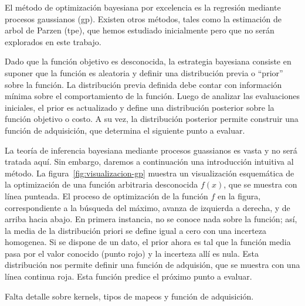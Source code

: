 El método de optimización bayesiana por excelencia es la regresión 
mediante procesos gaussianos (\acs{gp}). Existen otros métodos, tales 
como la estimación de arbol de Parzen (\acs{tpe}), que hemos estudiado 
inicialmente pero que no serán explorados en este trabajo. 

Dado que la función objetivo es desconocida, la estrategia bayesiana 
consiste en suponer que la función es aleatoria y definir una 
distribución previa o ``prior'' sobre la función. La distribución previa 
definida debe contar con información mínima sobre el comportamiento de la 
función. Luego de analizar las evaluaciones iniciales, el prior es 
actualizado y define una distribución posterior sobre la función objetivo 
o costo. A su vez, la distribución posterior permite construir una 
función de adquisición, que determina el siguiente punto a evaluar. 

La teoría de inferencia bayesiana mediante procesos guassianos es vasta
y no será tratada aquí. Sin embargo, daremos a continuación una 
introducción intuitiva al método. La figura~\ref{fig:visualizacion-gp} 
muestra un visualización esquemática de la optimización de una función
arbitraria desconocida $f(x)$, que se muestra con línea punteada. El 
proceso de optimización de la función $f$ en la figura, correspondiente 
a la búsqueda del máximo, avanza de izquierda a derecha, y de arriba 
hacia abajo. En primera instancia, no se conoce nada sobre la función; 
así, la media de la distribución priori se define igual a cero con una 
incerteza homogenea. Si se dispone de un dato, el prior ahora es tal que 
la función media pasa por el valor conocido (punto rojo) y la incerteza 
allí es nula. Esta distribución nos permite definir una función de 
adquisión, que se muestra con una línea continua roja. Esta función 
predice el próximo punto a evaluar. 


{\color{red} Falta detalle sobre kernels, tipos de mapeos y función de 
adquisición.}


